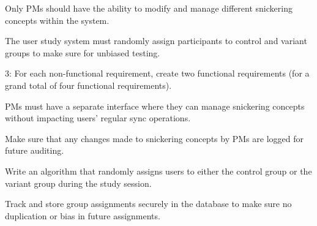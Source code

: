 Only PMs should have the ability to modify and manage different snickering concepts within the system.

The user study system must randomly assign participants to control and variant groups to make sure for unbiased testing.

3:
For each non-functional requirement, create two functional requirements (for a grand total of four functional requirements).


PMs must have a separate interface where they can manage snickering concepts without impacting users’ regular sync operations.

Make sure that any changes made to snickering concepts by PMs are logged for future auditing.



Write an algorithm that randomly assigns users to either the control group or the variant group during the study session.

Track and store group assignments securely in the database to make sure no duplication or bias in future assignments.
